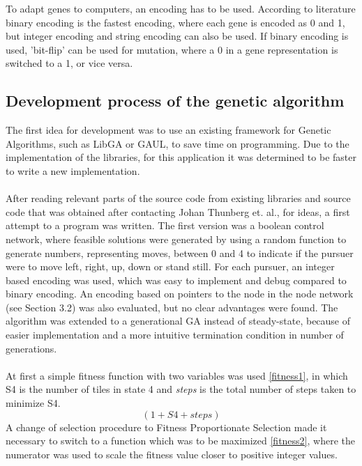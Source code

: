 To adapt genes to computers, an encoding has to be used.  According to literature \cite{GAHandbook1} binary encoding is the fastest encoding, where each gene is encoded as 0 and 1, but integer encoding and string encoding can also be used. If binary encoding is used, 'bit-flip' can be used for mutation, where a 0 in a gene representation is switched to a 1, or vice versa.
\subsection{Development process of the genetic algorithm}
The first idea for development was to use an existing framework for Genetic Algorithms, such as LibGA \cite{libGA} %
or GAUL\cite{GAUL}, to save time on programming. Due to the implementation of the libraries, for this application it was determined to be faster to write a new implementation.\\\\
%
After reading relevant parts of the source code from existing libraries and source code that was obtained after contacting Johan Thunberg et. al., for ideas, a first attempt to a program was written. The first version was a boolean control network, where feasible solutions were generated by using a random function to generate numbers, representing moves, between 0 and 4 to indicate if the pursuer were to move left, right, up, down or stand still. For each pursuer, an integer based encoding was used, which was easy to implement and debug compared to binary encoding. An encoding based on pointers to the node in the node network (see Section 3.2) was also evaluated, but no clear advantages were found. The algorithm was extended to a generational GA instead of steady-state, because of easier implementation and a more intuitive termination condition in number of generations.\\\\
At first a simple fitness function with two variables was used \eqref{fitness1}, in which S4 is the number of tiles in state 4 and \textit{steps} is the total number of steps taken to minimize S4.
%
\begin{equation}\label{fitness1} (1+S4+steps) \end{equation}
%
A change of selection procedure to Fitness Proportionate Selection made it necessary to switch to a function which was to be maximized \eqref{fitness2},  where the numerator was used to scale the fitness value closer to positive integer values.
